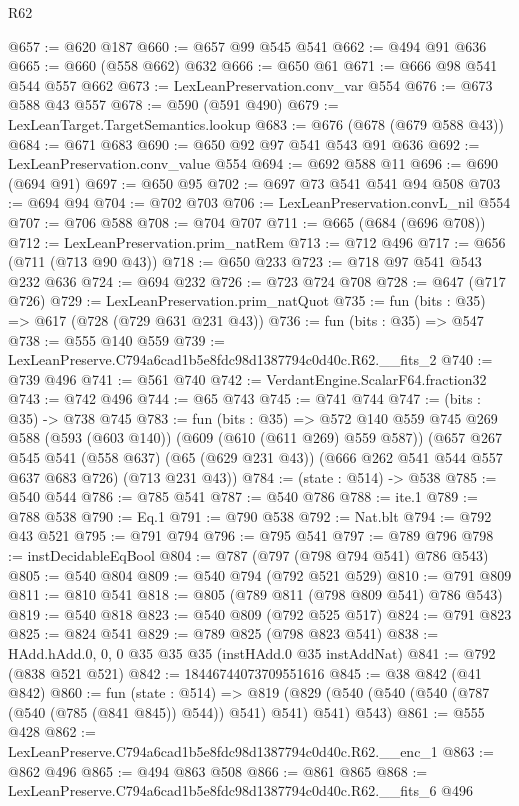 \begin{lexlean}{R62}
\begin{coremodule}
@657 := @620 @187
@660 := @657 @99 @545 @541
@662 := @494 @91 @636
@665 := @660 (@558 @662) @632
@666 := @650 @61
@671 := @666 @98 @541 @544 @557 @662
@673 := LexLeanPreservation.conv_var @554
@676 := @673 @588 @43 @557
@678 := @590 (@591 @490)
@679 := LexLeanTarget.TargetSemantics.lookup
@683 := @676 (@678 (@679 @588 @43))
@684 := @671 @683
@690 := @650 @92 @97 @541 @543 @91 @636
@692 := LexLeanPreservation.conv_value @554
@694 := @692 @588 @11
@696 := @690 (@694 @91)
@697 := @650 @95
@702 := @697 @73 @541 @541 @94 @508
@703 := @694 @94
@704 := @702 @703
@706 := LexLeanPreservation.convL_nil @554
@707 := @706 @588
@708 := @704 @707
@711 := @665 (@684 (@696 @708))
@712 := LexLeanPreservation.prim_natRem
@713 := @712 @496
@717 := @656 (@711 (@713 @90 @43))
@718 := @650 @233
@723 := @718 @97 @541 @543 @232 @636
@724 := @694 @232
@726 := @723 @724 @708
@728 := @647 (@717 @726)
@729 := LexLeanPreservation.prim_natQuot
@735 := fun (bits : @35) => @617 (@728 (@729 @631 @231 @43))
@736 := fun (bits : @35) => @547
@738 := @555 @140 @559
@739 := LexLeanPreserve.C794a6cad1b5e8fdc98d1387794c0d40c.R62.__fits_2
@740 := @739 @496
@741 := @561 @740
@742 := VerdantEngine.ScalarF64.fraction32
@743 := @742 @496
@744 := @65 @743
@745 := @741 @744
@747 := (bits : @35) -> @738 @745
@783 := fun (bits : @35) =>
  @572
    @140
    @559
    @745
    @269
    @588
    (@593 (@603 @140))
    (@609 (@610 (@611 @269) @559 @587))
    (@657
      @267
      @545
      @541
      (@558 @637)
      (@65 (@629 @231 @43))
      (@666 @262 @541 @544 @557 @637 @683 @726)
      (@713 @231 @43))
@784 := (state : @514) -> @538
@785 := @540 @544
@786 := @785 @541
@787 := @540 @786
@788 := ite.{1}
@789 := @788 @538
@790 := Eq.{1}
@791 := @790 @538
@792 := Nat.blt
@794 := @792 @43 @521
@795 := @791 @794
@796 := @795 @541
@797 := @789 @796
@798 := instDecidableEqBool
@804 := @787 (@797 (@798 @794 @541) @786 @543)
@805 := @540 @804
@809 := @540 @794 (@792 @521 @529)
@810 := @791 @809
@811 := @810 @541
@818 := @805 (@789 @811 (@798 @809 @541) @786 @543)
@819 := @540 @818
@823 := @540 @809 (@792 @525 @517)
@824 := @791 @823
@825 := @824 @541
@829 := @789 @825 (@798 @823 @541)
@838 := HAdd.hAdd.{0, 0, 0} @35 @35 @35 (instHAdd.{0} @35 instAddNat)
@841 := @792 (@838 @521 @521)
@842 := 18446744073709551616
@845 := @38 @842 (@41 @842)
@860 := fun (state : @514) =>
  @819 (@829 (@540 (@540 (@540 (@787 (@540 (@785 (@841 @845)) @544)) @541) @541) @541) @543)
@861 := @555 @428
@862 := LexLeanPreserve.C794a6cad1b5e8fdc98d1387794c0d40c.R62.__enc_1
@863 := @862 @496
@865 := @494 @863 @508
@866 := @861 @865
@868 := LexLeanPreserve.C794a6cad1b5e8fdc98d1387794c0d40c.R62.__fits_6 @496

\end{coremodule}
\end{lexlean}
